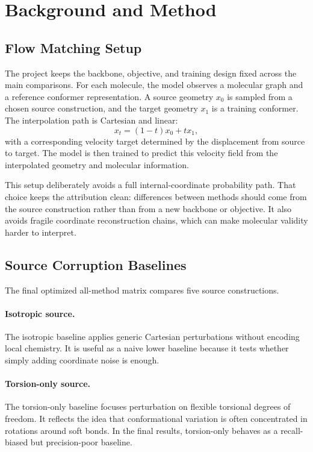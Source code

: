 \documentclass[11pt]{article}
\begin{document}
\section{Background and Method}

\subsection{Flow Matching Setup}

The project keeps the backbone, objective, and training design fixed across the main comparisons. For each molecule, the model observes a molecular graph and a reference conformer representation. A source geometry $x_0$ is sampled from a chosen source construction, and the target geometry $x_1$ is a training conformer. The interpolation path is Cartesian and linear:
\begin{equation}
    x_t = (1-t)x_0 + t x_1,
\end{equation}
with a corresponding velocity target determined by the displacement from source to target. The model is then trained to predict this velocity field from the interpolated geometry and molecular information.

This setup deliberately avoids a full internal-coordinate probability path. That choice keeps the attribution clean: differences between methods should come from the source construction rather than from a new backbone or objective. It also avoids fragile coordinate reconstruction chains, which can make molecular validity harder to interpret.

\subsection{Source Corruption Baselines}

The final optimized all-method matrix compares five source constructions.

\paragraph{Isotropic source.}
The isotropic baseline applies generic Cartesian perturbations without encoding local chemistry. It is useful as a naive lower baseline because it tests whether simply adding coordinate noise is enough.

\paragraph{Torsion-only source.}
The torsion-only baseline focuses perturbation on flexible torsional degrees of freedom. It reflects the idea that conformational variation is often concentrated in rotations around soft bonds. In the final results, torsion-only behaves as a recall-biased but precision-poor baseline.
\end{document}
